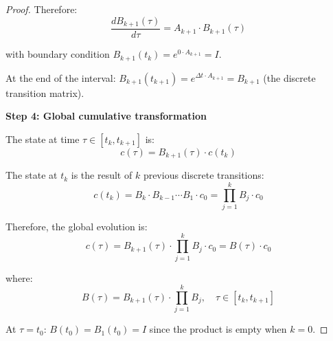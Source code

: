\documentclass[11pt,a4paper]{article}
\theoremstyle{plain}
\theoremstyle{definition}
\begin{document}
\begin{proof}
\vspace{0.5em}

Therefore:
\begin{equation}
\boxed{\frac{dB_{k+1}(\tau)}{d\tau} = A_{k+1} \cdot B_{k+1}(\tau)}
\label{eq:diff_eq_matrix_app}
\end{equation}

\vspace{0.5em}

with boundary condition $B_{k+1}(t_k) = e^{0 \cdot A_{k+1}} = I$.

\vspace{0.5em}

At the end of the interval: $B_{k+1}(t_{k+1}) = e^{\Delta t \cdot A_{k+1}} = B_{k+1}$ (the discrete transition matrix).

\vspace{0.5em}

\textbf{Step 4: Global cumulative transformation}

\vspace{0.5em}

The state at time $\tau \in [t_k, t_{k+1}]$ is:
\begin{equation}
c(\tau) = B_{k+1}(\tau) \cdot c(t_k)
\end{equation}

\vspace{0.5em}

The state at $t_k$ is the result of $k$ previous discrete transitions:
\begin{equation}
c(t_k) = B_k \cdot B_{k-1} \cdots B_1 \cdot c_0 = \prod_{j=1}^{k} B_j \cdot c_0
\end{equation}

\vspace{0.5em}

Therefore, the global evolution is:
\begin{equation}
c(\tau) = B_{k+1}(\tau) \cdot \prod_{j=1}^{k} B_j \cdot c_0 = B(\tau) \cdot c_0
\end{equation}

\vspace{0.5em}

where:
\begin{equation}
B(\tau) = B_{k+1}(\tau) \cdot \prod_{j=1}^{k} B_j, \quad \tau \in [t_k, t_{k+1}]
\end{equation}

\vspace{0.5em}

At $\tau = t_0$: $B(t_0) = B_1(t_0) = I$ since the product is empty when $k=0$.


\end{proof}
\end{document}
